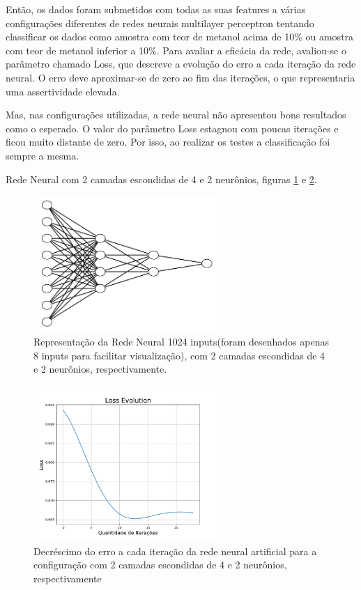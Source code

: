 \documentclass{article}
\begin{document}
Então, os dados foram submetidos com todas as suas features a várias configurações diferentes de redes neurais multilayer perceptron tentando classificar os dados como amostra com teor de metanol acima de 10\% ou amostra com teor de metanol inferior a 10\%. Para avaliar a eficácia da rede, avaliou-se o parâmetro chamado Loss, que descreve a evolução do erro a cada iteração da rede neural. O erro deve aproximar-se de zero ao fim das iterações, o que representaria uma assertividade elevada.

Mas, nas configurações utilizadas, a rede neural não apresentou bons resultados como o esperado. O valor do parâmetro Loss estagnou com poucas iterações e ficou muito distante de zero. Por isso, ao realizar os testes a classificação foi sempre a mesma.

Rede Neural com 2 camadas escondidas de 4 e 2 neurônios, figuras \ref{rna_4_2} e \ref{rna_4_2_loss}.

\begin{figure}[ht]
\centering
\includegraphics[width=7cm]{rna_4_2}
\caption{Representação da Rede Neural 1024 inputs(foram desenhados apenas 8 inputs para facilitar visualização), com 2 camadas escondidas de 4 e 2 neurônios, respectivamente.}
\label{rna_4_2}
\end{figure}

\begin{figure}[ht]
\centering
\includegraphics[width=7cm]{rna_4_2_loss}
\caption{Decréscimo do erro a cada iteração da rede neural artificial para a configuração com 2 camadas escondidas de 4 e 2 neurônios, respectivamente}
\label{rna_4_2_loss}
\end{figure}
\end{document}
